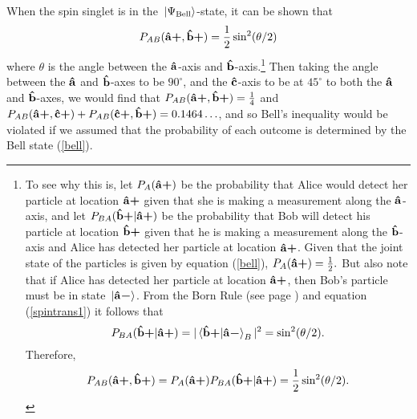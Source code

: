 When the spin singlet is in the $\ket*{\Psi_{\text{Bell}}}$-state, it can be shown that 
      \begin{equation}\label{bellsin}
      P_{AB}({\vb{\hat{{a}}}\bm{+}},{\vb{\hat{{b}}}\bm{+}})=\frac{1}{2}\sin^2(\theta/2)
      \end{equation}
where $\theta$ is the angle between the $\vb{\hat{{a}}}$-axis and $\vb{\hat{{b}}}$-axis.\footnote{To see why this is, let $P_A({\vb{\hat{{a}}}\bm{+}})$ be the probability that Alice would detect her particle at location ${\vb{\hat{{a}}}\bm{+}}$ given that she is making a measurement along the $\vb{\hat{{a}}}$-axis, and let $P_{BA}({\vb{\hat{{b}}}\bm{+}}|{\vb{\hat{{a}}}\bm{+}})$ be the probability that Bob will detect his particle at location ${\vb{\hat{{b}}}\bm{+}}$ given that he is making a measurement along the $\vb{\hat{{b}}}$-axis and Alice has detected her particle at location ${\vb{\hat{{a}}}\bm{+}}$. Given that the joint state of the particles is given by equation (\ref{bell}), $P_A({\vb{\hat{{a}}}\bm{+}})=\frac{1}{2}.$ But also note that if  Alice has detected her particle at location ${\vb{\hat{{a}}}\bm{+}}$, then Bob's particle must be in state $\ket*{{\vb{\hat{{a}}}\bm{-}}}$. From the Born Rule (see page \pageref{bornrule}) and equation (\ref{spintrans1}) it follows that 
      \begin{equation*}
P_{BA}(\uvbp{b}|\uvbp{a})= |\ip*{\uvbp{b}}{\uvbm{a}}_B|^2=\sin^2(\theta/2).
\end{equation*} 
Therefore, 
\begin{equation*}
P_{AB}({\vb{\hat{{a}}}\bm{+}},{\vb{\hat{{b}}}\bm{+}})= P_A({\vb{\hat{{a}}}\bm{+}})P_{BA}({\vb{\hat{{b}}}\bm{+}}|{\vb{\hat{{a}}}\bm{+}})=\frac{1}{2}\sin^2(\theta/2).
\end{equation*}} 
Then taking the angle between the $\vb{\hat{{a}}}$ and $\vb{\hat{{b}}}$-axes to be $90^\circ$, and the $\vb{\hat{{c}}}$-axis to be at $45^\circ$ to both the $\vb{\hat{{a}}}$ and $\vb{\hat{{b}}}$-axes, we would find that $P_{AB}({\vb{\hat{{a}}}\bm{+}},{\vb{\hat{{b}}}\bm{+}})=\frac{1}{4}$ and $P_{AB}({\vb{\hat{{a}}}\bm{+}},{\vb{\hat{{c}}}\bm{+}})+P_{AB}({\vb{\hat{{c}}}\bm{+}},{\vb{\hat{{b}}}\bm{+}})=0.1464\ldots$, and so Bell's inequality would be violated if we assumed that the probability of each outcome is determined by the Bell state  (\ref{bell}). 
      